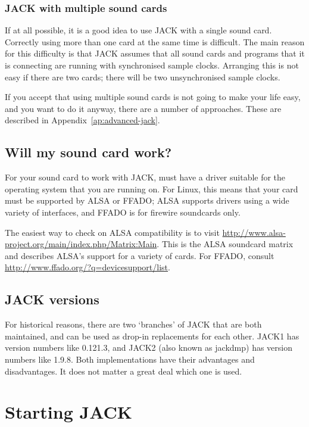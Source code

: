 \documentclass[10pt,a4paper]{book}
\begin{document}
\subsubsection{JACK with multiple sound cards}
\label{sec:jack-multiple-cards}

If at all possible, it is a good idea to use JACK with a single sound
card.  Correctly using more than one card at the same time is
difficult.  The main reason for this difficulty is that JACK assumes
that all sound cards and programs that it is connecting are running
with synchronised sample clocks.  Arranging this is not easy if there
are two cards; there will be two unsynchronised sample clocks.

If you accept that using multiple sound cards is not going to make
your life easy, and you want to do it anyway, there are a number of
approaches.  These are described in Appendix~\ref{ap:advanced-jack}.

\subsection{Will my sound card work?}

For your sound card to work with JACK, must have a driver suitable for
the operating system that you are running on.  For Linux, this means
that your card must be supported by ALSA or FFADO; ALSA supports
drivers using a wide variety of interfaces, and FFADO is for firewire
soundcards only. 

The easiest way to check on ALSA compatibility is to visit
\url{http://www.alsa-project.org/main/index.php/Matrix:Main}.  This is
the ALSA soundcard matrix and describes ALSA's support for a variety
of cards.  For FFADO, consult
\url{http://www.ffado.org/?q=devicesupport/list}.


\subsection{JACK versions}

For historical reasons, there are two `branches' of JACK that are both
maintained, and can be used as drop-in replacements for each other.
JACK1 has version numbers like 0.121.3, and JACK2 (also known as
jackdmp) has version numbers like 1.9.8.  Both implementations have
their advantages and disadvantages.  It does not matter a great deal
which one is used.



\section{Starting JACK}
\end{document}

